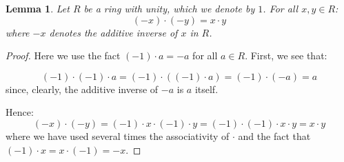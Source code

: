 \documentclass[12pt]{article}
\newtheorem{lemma}{Lemma}
\begin{document}
\begin{lemma}
Let $R$ be a ring with unity, which we denote by $1$. For all $x,y\in R$:
$$(-x)\cdot (-y)=x\cdot y$$
where $-x$ denotes the additive inverse of $x$ in $R$.
\end{lemma}
\begin{proof}
Here we use the fact $(-1)\cdot a = -a$ for all $a \in R$. First, we see that:

$$(-1)\cdot (-1)\cdot a=(-1)\cdot \left( (-1)\cdot a \right)=(-1)\cdot (-a)=a$$
since, clearly, the additive inverse of $-a$ is $a$ itself.

Hence:
$$(-x)\cdot (-y)=(-1)\cdot x \cdot (-1)\cdot y= (-1)\cdot (-1) \cdot x\cdot y= x \cdot y$$
where we have used several times the associativity of $\cdot$ and the fact that $(-1)\cdot x = x \cdot (-1) = -x$.
\end{proof}
\end{document}

